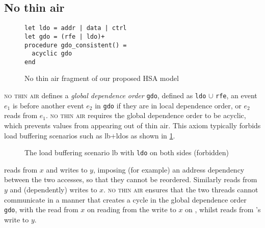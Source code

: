 \documentclass[a4paper]{article}
\begin{document}
\subsection{No thin air \label{sec:no-thin-air}}

\begin{figure}[!h]
\begin{verbatim}
let ldo = addr | data | ctrl 
let gdo = (rfe | ldo)+
procedure gdo_consistent() = 
  acyclic gdo
end 
\end{verbatim}
\vspace*{-4mm}
\caption{No thin air fragment of our proposed HSA model}
\end{figure}

\textsc{no thin air} defines a \emph{global dependence order} {\tt gdo},
defined as {\tt ldo} $\cup$ {\tt rfe}, \ie an event $e_1$ is before another
event $e_2$ in {\tt gdo} if they are in local dependence order, or $e_2$ reads
from $e_1$.  \textsc{no thin air} requires the global dependence order to be
acyclic, which prevents values from appearing out of thin air. This axiom
typically forbids load buffering scenarios such as \textsf{lb+ldos} as shown in
\myfig\ref{fig:lb}.

\begin{figure}[!h]
\vspace*{-2mm}
\begin{center}
\end{center}
\vspace*{-7mm}
\caption{The load buffering scenario \textsf{lb} with {\tt ldo} on both sides
(forbidden) \label{fig:lb}} \end{figure}

 reads from $x$ and writes to $y$, imposing (for example) an address
dependency between the two accesses, so that they cannot be reordered.
Similarly  reads from $y$ and (dependently) writes to $x$.  \textsc{no
thin air} ensures that the two threads cannot communicate in a manner that
creates a cycle in the global dependence order {\tt gdo}, with the read from
$x$ on  reading from the write to $x$ on , whilst 
reads from 's write to $y$.

\end{document}
